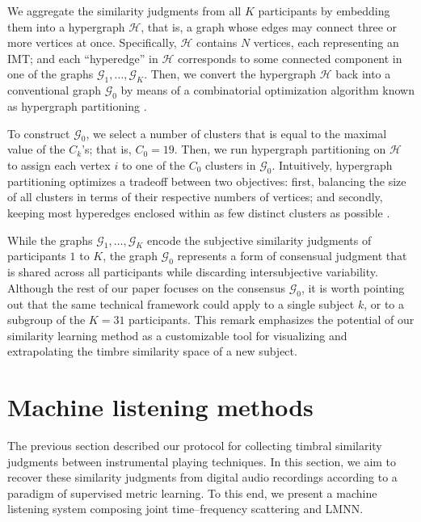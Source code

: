 \documentclass{bmcart}
\newcommand{\nmu}{}
\begin{document}
We aggregate the similarity judgments from all $K$ participants by embedding them into a hypergraph $\mathcal{H}$, that is, a graph whose edges may connect three or more vertices at once.
Specifically, $\mathcal{H}$ contains $N$ vertices, each representing an IMT; and each ``hyperedge'' in $\mathcal{H}$ corresponds to some connected component in one of the graphs $\mathcal{G}_1, \ldots, \mathcal{G}_K$.
Then, we convert the hypergraph $\mathcal{H}$ back into a conventional graph $\mathcal{G}_0$ by means of a combinatorial optimization algorithm known as hypergraph partitioning \cite{kernighan1970efficient}.

To construct $\mathcal{G}_0$, we select a number of clusters that is equal to the maximal value of the $C_k$'s; that is, $C_0 = 19$.
Then, we run hypergraph partitioning on $\mathcal{H}$ to assign each vertex $i$ to one of the $C_0$ clusters in $\mathcal{G}_0$.
Intuitively, hypergraph partitioning optimizes a tradeoff between two objectives: first, balancing the size of all clusters in terms of their respective numbers of vertices; and secondly, keeping most hyperedges enclosed within as few distinct clusters as possible \cite{han1997scalable,strehl2002cluster}.

While the graphs $\mathcal{G}_1, \ldots, \mathcal{G}_K$ encode the subjective similarity judgments of participants $1$ to $K$, the graph $\mathcal{G}_0$ represents a form of consensual judgment that is shared across all participants while discarding intersubjective variability.
Although the rest of our paper focuses on the consensus $\mathcal{G}_0$, it is worth pointing out that the same technical framework could apply to a single subject $k$, or to a subgroup of the $K=31$ participants.
This remark emphasizes the potential of our similarity learning method as a customizable tool for visualizing and extrapolating the timbre similarity space of a new subject.


\section*{\nmu Machine listening methods}
\label{sec:methods}
The previous section described our protocol for collecting timbral similarity judgments between instrumental playing techniques.
In this section, we aim to recover these similarity judgments from digital audio recordings according to a paradigm of supervised metric learning.
To this end, we present a machine listening system composing joint time--frequency scattering and LMNN.
\end{document}
